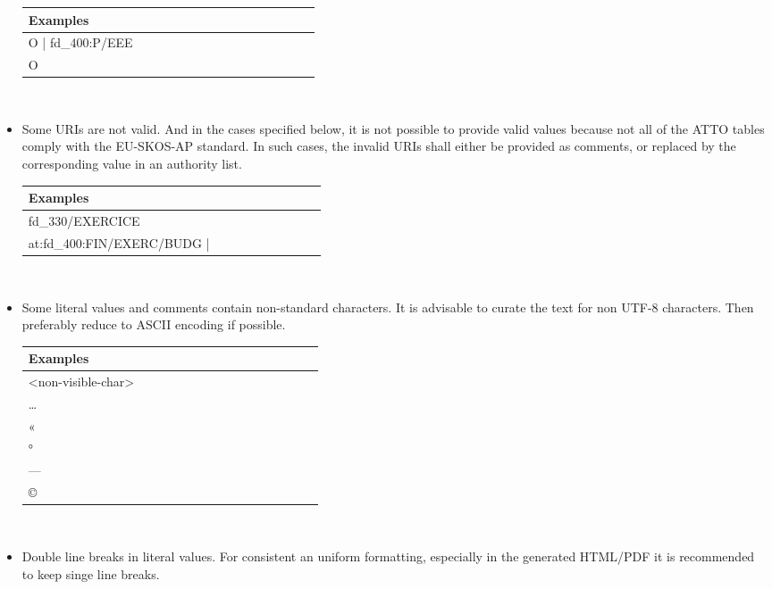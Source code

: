\begin{itemize}
    \begin{tabular}{|p{0.4\linewidth}|}
        \hline
        \textbf{Examples} \\ \hline
        O | fd\_400:P/EEE     \\ \hline
        O      \\ \hline
    \end{tabular}
    \\
    \item
    Some URIs are not valid. And in the cases specified below, it is not possible to provide valid values because not all of the ATTO tables comply with the EU-SKOS-AP standard. In such cases, the invalid URIs shall either be provided as comments, or replaced by the  corresponding value in an authority list.

    \begin{tabular}{|p{0.4\linewidth}|}
        \hline
        \textbf{Examples} \\ \hline
        fd\_330/EXERCICE      \\ \hline
        at:fd\_400:FIN/EXERC/BUDG |      \\ \hline
    \end{tabular}
    \\
    \item
    Some literal values and comments contain non-standard characters.
    It is advisable to curate the text for non UTF-8 characters. Then preferably reduce to ASCII encoding if possible.

    \begin{tabular}{|p{0.4\linewidth}|}
        \hline
        \textbf{Examples} \\ \hline
        <non-visible-char>      \\ \hline
        …      \\ \hline
        «       \\ \hline
        °       \\ \hline
        —       \\ \hline
        ©       \\ \hline
    \end{tabular}
    \\
    \item
    Double line breaks in literal values. For consistent an uniform formatting, especially in the generated HTML/PDF it is recommended to keep singe line breaks.


\end{itemize}
